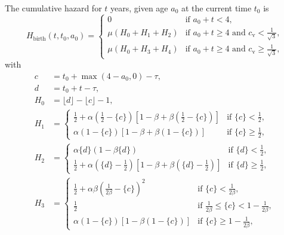 \documentclass[12pt]{article}
\begin{document}
The cumulative hazard for $t$ years, given age $a_0$ at the current
time $t_0$ is
\begin{equation}
  H_{\text{birth}}(t, t_0, a_0) =
  \begin{cases}
    0 & \text{if $a_0 + t < 4$},
    \\
    \mu \left(H_0 + H_1  + H_2\right)
    & \text{if $a_0 + t \geq 4$ and $c_{\text{v}} < \frac{1}{\sqrt{3}}$},
    \\
    \mu \left(H_0 + H_3 + H_4\right)
    & \text{if $a_0 + t \geq 4$ and $c_{\text{v}} \geq \frac{1}{\sqrt{3}}$},
  \end{cases}
\end{equation}
with
\begin{equation}
  \begin{split}
    c &= t_0 + \max(4 - a_0, 0) - \tau,
    \\
    d &= t_0 + t - \tau,
    \\
    H_0 &= \lfloor d \rfloor - \lfloor c \rfloor - 1,
    \\
    H_1 &=
    \begin{cases}
      \frac{1}{2}
      + \alpha \left(\frac{1}{2} - \{c\}\right)
      \left[1 - \beta
        + \beta \left(\frac{1}{2} - \{c\}\right)\right]
      & \text{if $\{c\} < \frac{1}{2}$},
      \\
      \alpha \left(1 - \{c\}\right)
      \left[1 - \beta + \beta \left(1 - \{c\}\right)\right]
      & \text{if $\{c\} \geq \frac{1}{2}$},
    \end{cases}
    \\
    H_2 &=
    \begin{cases}
      \alpha \{d\}\left(1 - \beta \{d\}\right)
      & \text{if $\{d\} < \frac{1}{2}$},
      \\
      \frac{1}{2}
      + \alpha \left(\{d\} - \frac{1}{2}\right)
      \left[1 - \beta
        + \beta \left(\{d\} - \frac{1}{2}\right)\right]
      & \text{if $\{d\} \geq \frac{1}{2}$},
    \end{cases}
    \\
    H_3 &=
    \begin{cases}
      \frac{1}{2} + \alpha \beta \left(\frac{1}{2 \beta} - \{c\}\right)^2
      & \text{if $\{c\} < \frac{1}{2 \beta}$},
      \\
      \frac{1}{2}
      & \text{if $\frac{1}{2 \beta} \leq \{c\} < 1 - \frac{1}{2 \beta}$},
      \\
      \alpha \left(1 - \{c\}\right) \left[1 -
        \beta \left(1 - \{c\}\right)\right]
      & \text{if $\{c\} \geq 1 - \frac{1}{2 \beta}$},

\end{cases}
\end{split}
\end{equation}
\end{document}

